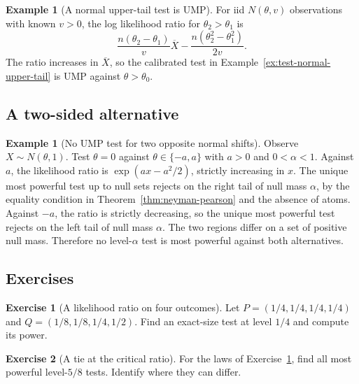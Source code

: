 \documentclass[11pt,oneside]{book}
\theoremstyle{definition}
\newtheorem{example}[theorem]{Example}
\newtheorem{exercise}{Exercise}[section]
\theoremstyle{remark}
\begin{document}
\begin{example}[A normal upper-tail test is UMP]
\label{ex:ump-normal-upper-tail}
For iid $N(\theta,v)$ observations with known $v>0$, the log
likelihood ratio for $\theta_2>\theta_1$ is
\[
\frac{n(\theta_2-\theta_1)}{v}\overline X
-\frac{n(\theta_2^2-\theta_1^2)}{2v}.
\]
The ratio increases in $\overline X$, so the calibrated test
in Example~\ref{ex:test-normal-upper-tail} is UMP against
$\theta>\theta_0$.
\end{example}

\subsection{A two-sided alternative}
\label{subsec:np-no-ump-two-sided}

\begin{example}[No UMP test for two opposite normal shifts]
\label{ex:no-ump-opposite-normal-shifts}
Observe $X\sim N(\theta,1)$. Test $\theta=0$ against
$\theta\in\{-a,a\}$ with $a>0$ and $0<\alpha<1$.
Against $a$, the likelihood ratio is $\exp(ax-a^2/2)$,
strictly increasing in $x$. The unique most powerful test
up to null sets rejects on the right tail of null mass $\alpha$,
by the equality condition in Theorem~\ref{thm:neyman-pearson}
and the absence of atoms. Against $-a$, the ratio is strictly
decreasing, so the unique most powerful test rejects on the
left tail of null mass $\alpha$. The two regions differ on
a set of positive null mass. Therefore no level-$\alpha$ test
is most powerful against both alternatives.
\end{example}

\subsection{Exercises}
\label{subsec:exercises-6-2}

\begin{exercise}[A likelihood ratio on four outcomes]
\label{exer:np-four-ratios}
Let $P=(1/4,1/4,1/4,1/4)$ and $Q=(1/8,1/8,1/4,1/2)$.
Find an exact-size test at level $1/4$ and compute its power.
\end{exercise}

\begin{exercise}[A tie at the critical ratio]
\label{exer:np-finite-tie}
For the laws of Exercise~\ref{exer:np-four-ratios}, find all
most powerful level-$5/8$ tests. Identify where they can differ.
\end{exercise}
\end{document}

